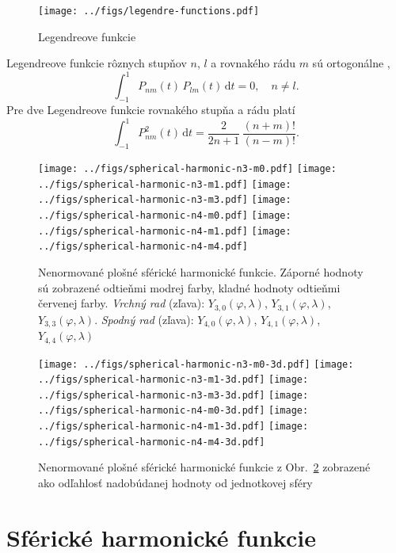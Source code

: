 \documentclass[a4paper, 12pt]{book}
\newcommand{\diff}{\mathrm d}
\begin{document}
\begin{figure}[bt]
\label{fig:lf}
\centering
\texttt{[image: ../figs/legendre-functions.pdf]}
\caption{Legendreove funkcie}
\end{figure}

Legendreove funkcie rôznych stupňov $n$, $l$ a rovnakého rádu $m$ sú 
ortogonálne \citep{Freeden2009},
%
\begin{equation}
\int_{-1}^{1} P_{nm}(t) \, P_{lm}(t) \, \diff t = 0{,} \quad n \neq l{.}
\end{equation}
%
Pre dve Legendreove funkcie rovnakého stupňa a rádu platí
\begin{equation}
\int_{-1}^{1} P^2_{nm}(t) \, \diff t = \frac{2}{2n + 1} \, \frac{(n + m)!}{(n 
- m)!}{.}
\end{equation}


\begin{figure}[bt]
\centering
\texttt{[image: ../figs/spherical-harmonic-n3-m0.pdf]}
\texttt{[image: ../figs/spherical-harmonic-n3-m1.pdf]}
\texttt{[image: ../figs/spherical-harmonic-n3-m3.pdf]}
\texttt{[image: ../figs/spherical-harmonic-n4-m0.pdf]}
\texttt{[image: ../figs/spherical-harmonic-n4-m1.pdf]}
\texttt{[image: ../figs/spherical-harmonic-n4-m4.pdf]}
\caption{Nenormované plošné sférické harmonické funkcie.  Záporné hodnoty sú 
zobrazené odtieňmi modrej farby, kladné hodnoty odtieňmi červenej farby.  
\textit{Vrchný rad} (zľava): $Y_{3,0}(\varphi, \lambda)$, $Y_{3,1}(\varphi, 
\lambda)$, $Y_{3,3}(\varphi, \lambda)$.  \textit{Spodný rad} (zľava): 
$Y_{4,0}(\varphi, \lambda)$, $Y_{4,1}(\varphi, \lambda)$, $Y_{4,4}(\varphi, 
\lambda)$}
\label{fig:sh}
\end{figure}


\begin{figure}[bt]
\centering
\texttt{[image: ../figs/spherical-harmonic-n3-m0-3d.pdf]}
\texttt{[image: ../figs/spherical-harmonic-n3-m1-3d.pdf]}
\texttt{[image: ../figs/spherical-harmonic-n3-m3-3d.pdf]}
\texttt{[image: ../figs/spherical-harmonic-n4-m0-3d.pdf]}
\texttt{[image: ../figs/spherical-harmonic-n4-m1-3d.pdf]}
\texttt{[image: ../figs/spherical-harmonic-n4-m4-3d.pdf]}
\caption{Nenormované plošné sférické harmonické funkcie z Obr.~\ref{fig:sh} 
zobrazené ako odľahlosť nadobúdanej hodnoty od jednotkovej sféry}
\label{fig:sh3d}
\end{figure}



\section{Sférické harmonické funkcie}
\label{sec:spherical_harmonics}
\end{document}

